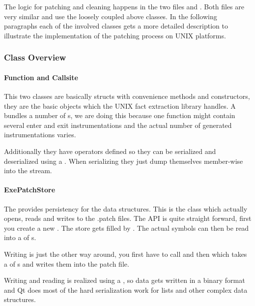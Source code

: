 The logic for patching and cleaning happens in the two files  and .  Both files are very similar and use the loosely coupled above classes.  In the following paragraphs each of the involved classes gets a more detailed description to illustrate the implementation of the patching process on UNIX platforms.

\subsubsection{Class Overview}

\paragraph{Function and Callsite}

This two classes are basically structs with convenience methods and constructors, they are the basic objects which the UNIX fact extraction library handles.  A  bundles a number of s, we are doing this because one function might contain several enter and exit instrumentations and the actual number of generated instrumentations varies.

Additionally they have operators defined so they can be serialized and deserialized using a .  When serializing they just dump themselves member-wise into the stream.

\paragraph{ExePatchStore}

The  provides persistency for the data structures.  This is the class which actually opens, reads and writes to the .patch files.  The API is quite straight forward, first you create a new .  The store gets filled by .  The actual symbols can then be read into a  of s.

Writing is just the other way around, you first have to call  and then  which takes a  of s and writes them into the patch file.

Writing and reading is realized using a , so data gets written in a binary format and Qt does most of the hard serialization work for lists and other complex data structures.

